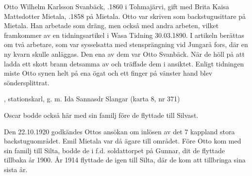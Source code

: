 
%
Otto Wilhelm Karlsson Svanbäck, .1860 i Tohmajärvi, gift med Brita Kaisa Mattsdotter Mietala, .1858 på Mietala. Otto var skriven som backstugusittare på Mietala. Han arbetade som dräng, men också med andra arbeten, vilket framkommer av en tidningsartikel i Wasa Tidning 30.03.1890. I artikeln berättas om två arbetare, som var sysselsatta med stensprängning vid Jungarå fors, där en ny kvarn skulle anläggas. Den ena av dem var Otto Svanbäck. När de höll på att ladda ett skott brann detsamma av och träffade dem i ansiktet. Enligt tidningen miste Otto synen helt på ena ögat och ett finger på vänster hand blev söndersplittrat.
\begin{jhchildren}
  \item {}
  \item {}
  \item {}
  \item {}
  \item {}, stationskarl, g. m. Ida Sannasdr Slangar (karta 8, nr 371)
  \item {}
  \item {}
  \item {}
  \item {}
\end{jhchildren}
Oscar bodde också här med sin familj före de flyttade till Silvast.

Den 22.10.1920 godkändes Ottos ansökan om inlösen av det 7 kappland stora backstuguområdet. Emil Mietala var då ägare till området. Före Otto kom med sin familj till Silta, bodde de i f.d. soldattorpet på Gunnar, dit de flyttade tillbaka år 1900. År 1914 flyttade de igen till Silta, där de kom att tillbringa sina sista år.

